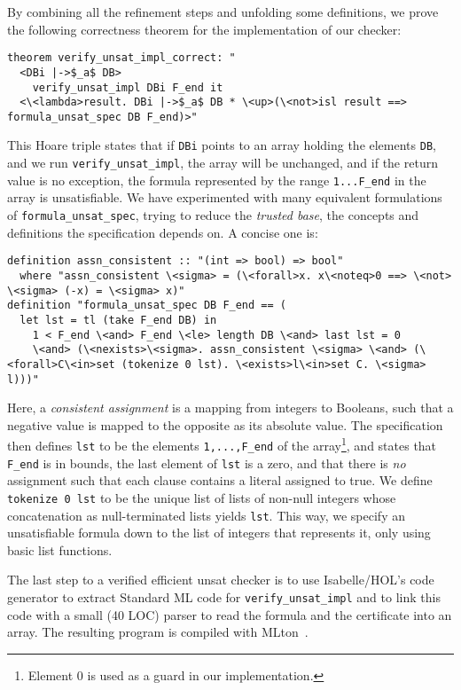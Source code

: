 \documentclass{llncs}
\newcommand{\isai}{\lstinline[language=isabelle,basicstyle=\normalsize\ttfamily\slshape]}
\begin{document}
By combining all the refinement steps and unfolding some definitions, we prove the following correctness theorem for the implementation of our checker:
\begin{lstlisting}
theorem verify_unsat_impl_correct: "
  <DBi |->$_a$ DB> 
    verify_unsat_impl DBi F_end it 
  <\<lambda>result. DBi |->$_a$ DB * \<up>(\<not>isl result ==> formula_unsat_spec DB F_end)>"
\end{lstlisting}
This Hoare triple states that if \isai$DBi$ points to an array holding the elements \isai$DB$,
and we run \isai$verify_unsat_impl$, the array will be unchanged, and if the return value is no exception,
the formula represented by the range \isai$1...F_end$ in the array is unsatisfiable. 
We have experimented with many equivalent formulations of \isai{formula_unsat_spec}, trying to reduce the \emph{trusted base}, 
\ie the concepts and definitions the specification depends on. A concise one is:
\begin{lstlisting}
definition assn_consistent :: "(int => bool) => bool"
  where "assn_consistent \<sigma> = (\<forall>x. x\<noteq>0 ==> \<not> \<sigma> (-x) = \<sigma> x)"
definition "formula_unsat_spec DB F_end == (
  let lst = tl (take F_end DB) in
    1 < F_end \<and> F_end \<le> length DB \<and> last lst = 0 
    \<and> (\<nexists>\<sigma>. assn_consistent \<sigma> \<and> (\<forall>C\<in>set (tokenize 0 lst). \<exists>l\<in>set C. \<sigma> l)))"
\end{lstlisting}
Here, a \emph{consistent assignment} is a mapping from integers to Booleans, such that a negative value is mapped to the opposite as its absolute value.
The specification then defines \isai$lst$ to be the elements \isai$1,...,F_end$ of the array\footnote{Element $0$ is used as a guard in our implementation.}, and
states that \isai$F_end$ is in bounds, the last element of \isai$lst$ is a zero, and that there is \emph{no} assignment such that each clause contains a literal assigned to true. 
We define \isai{tokenize 0 lst} to be the unique list of lists of non-null integers whose concatenation as null-terminated lists yields \isai{lst}.
This way, we specify an unsatisfiable formula down to the list of integers that represents it, only using basic list functions.

The last step to a verified efficient unsat checker is to use Isabelle/HOL's code generator to extract Standard ML code for \isai{verify_unsat_impl} and to
link this code with a small (40 LOC) parser to read the formula and the certificate into an array. The resulting program is compiled with MLton~\cite{MLton}.
\end{document}
